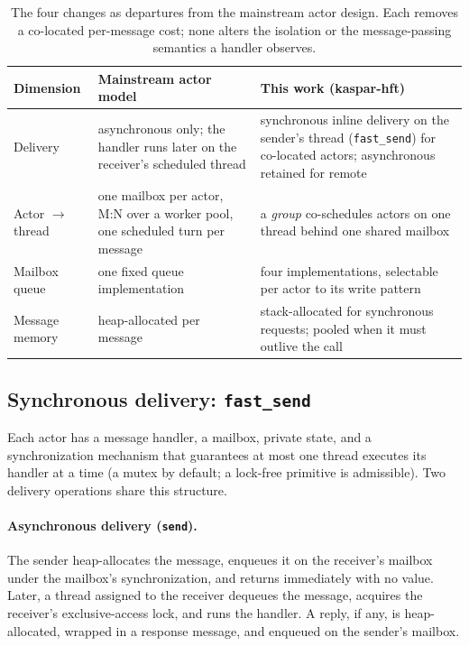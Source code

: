 \documentclass[11pt]{article}
\newcommand{\fs}{\texttt{fast\_send}}
\newcommand{\snd}{\texttt{send}}
\begin{document}
\begin{table}[h]
\centering
\caption{The four changes as departures from the mainstream actor design. Each
removes a co-located per-message cost; none alters the isolation or the
message-passing semantics a handler observes.}
\label{tab:contrast}
\small
\begin{tabular}{p{2.5cm} p{4.7cm} p{5.0cm}}
\toprule
Dimension & Mainstream actor model & This work (kaspar-hft) \\
\midrule
Delivery & asynchronous only; the handler runs later on the receiver's scheduled thread & synchronous inline delivery on the sender's thread (\fs{}) for co-located actors; asynchronous retained for remote \\
Actor $\to$ thread & one mailbox per actor, M:N over a worker pool, one scheduled turn per message & a \emph{group} co-schedules actors on one thread behind one shared mailbox \\
Mailbox queue & one fixed queue implementation & four implementations, selectable per actor to its write pattern \\
Message memory & heap-allocated per message & stack-allocated for synchronous requests; pooled when it must outlive the call \\
\bottomrule
\end{tabular}
\end{table}

\subsection{Synchronous delivery: \fs{}}
\label{sec:mech}

Each actor has a message handler, a mailbox, private state, and a synchronization
mechanism that guarantees at most one thread executes its handler at a time
(a mutex by default; a lock-free primitive is admissible). Two delivery
operations share this structure.

\paragraph{Asynchronous delivery (\snd{}).} The sender heap-allocates the
message, enqueues it on the receiver's mailbox under the mailbox's
synchronization, and returns immediately with no value. Later, a thread assigned
to the receiver dequeues the message, acquires the receiver's exclusive-access
lock, and runs the handler. A reply, if any, is heap-allocated, wrapped in a
response message, and enqueued on the sender's mailbox.
\end{document}
